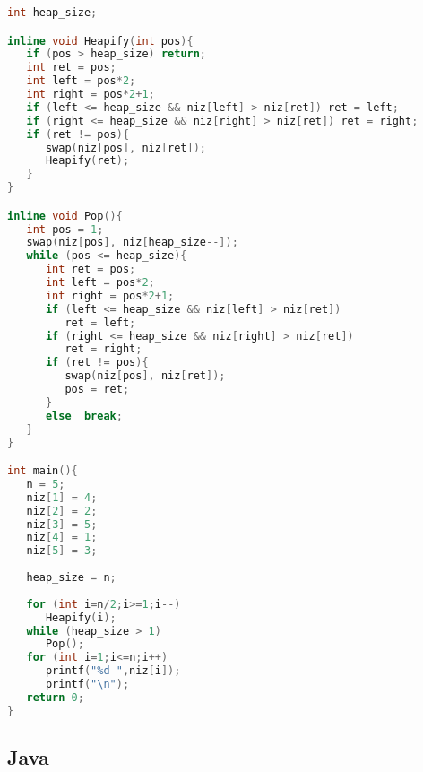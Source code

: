 \begin{lstlisting}[language=C++]
int heap_size;

inline void Heapify(int pos){
   if (pos > heap_size) return;
   int ret = pos;
   int left = pos*2;
   int right = pos*2+1;
   if (left <= heap_size && niz[left] > niz[ret]) ret = left;
   if (right <= heap_size && niz[right] > niz[ret]) ret = right;
   if (ret != pos){
      swap(niz[pos], niz[ret]);
      Heapify(ret);
   }
}

inline void Pop(){
   int pos = 1;
   swap(niz[pos], niz[heap_size--]);
   while (pos <= heap_size){
      int ret = pos;
      int left = pos*2;
      int right = pos*2+1;
      if (left <= heap_size && niz[left] > niz[ret]) 
         ret = left;
      if (right <= heap_size && niz[right] > niz[ret]) 
         ret = right;
      if (ret != pos){
         swap(niz[pos], niz[ret]);
         pos = ret;
      }
      else  break;
   }
}

int main(){
   n = 5;
   niz[1] = 4;
   niz[2] = 2;
   niz[3] = 5;
   niz[4] = 1;
   niz[5] = 3;
	
   heap_size = n;
	
   for (int i=n/2;i>=1;i--) 
      Heapify(i);
   while (heap_size > 1) 
      Pop();
   for (int i=1;i<=n;i++) 
      printf("%d ",niz[i]);
      printf("\n");
   return 0;
}

\end{lstlisting} 

\subsection{Java}

